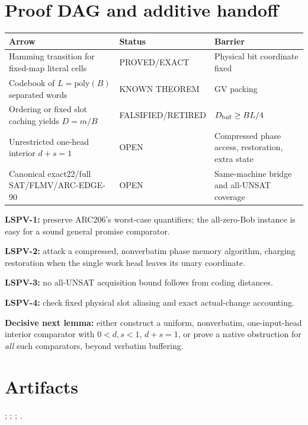\documentclass[11pt]{article}
\begin{document}
\section{Proof DAG and additive handoff}
\begin{center}\small
\begin{tabularx}{\linewidth}{p{.50\linewidth}p{.20\linewidth}X}
\toprule Arrow & Status & Barrier\\\midrule
Hamming transition for fixed-map literal cells & PROVED/EXACT & Physical bit coordinate fixed\\
Codebook of \(L=\mathrm{poly}(B)\) separated words & KNOWN THEOREM & GV packing\\
Ordering or fixed slot caching yields \(D=m/B\) & FALSIFIED/RETIRED & \(D_{\rm buf}\ge BL/4\)\\
Unrestricted one-head interior \(d+s=1\) & OPEN & Compressed phase access, restoration, extra state\\
Canonical exact22/full SAT/FLMV/ARC-EDGE-90 & OPEN & Same-machine bridge and all-UNSAT coverage\\\bottomrule
\end{tabularx}
\end{center}
\noindent\textbf{LSPV-1:} preserve ARC206's worst-case quantifiers; the all-zero-Bob instance is easy for a sound general promise comparator.
\par\noindent\textbf{LSPV-2:} attack a compressed, nonverbatim phase memory algorithm, charging restoration when the single work head leaves its unary coordinate.
\par\noindent\textbf{LSPV-3:} no all-UNSAT acquisition bound follows from coding distances.
\par\noindent\textbf{LSPV-4:} check fixed physical slot aliasing and exact actual-change accounting.
\par\noindent\textbf{Decisive next lemma:} either construct a uniform, nonverbatim, one-input-head interior comparator with \(0<d,s<1\), \(d+s=1\), or prove a native obstruction for \emph{all} such comparators, beyond verbatim buffering.

\section*{Artifacts}
;
;
;
.

\end{document}
